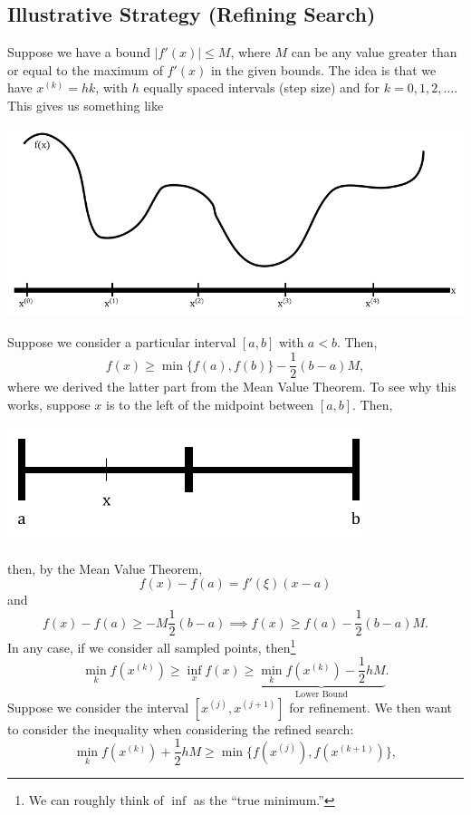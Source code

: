 \documentclass[letterpaper]{article}
\begin{document}
\subsection{Illustrative Strategy (Refining Search)}
Suppose we have a bound $|f'(x)| \leq M$, where $M$ can be any value greater than or equal to the maximum of $f'(x)$ in the given bounds. The idea is that we have $x^{(k)} = hk$, with $h$ equally spaced intervals (step size) and for $k = 0, 1, 2, \hdots$. This gives us something like 
\begin{center}
    \includegraphics[scale=0.5]{../assets/1varopt_ex2.png}
\end{center}
Suppose we consider a particular interval $[a, b]$ with $a < b$. Then, 
\[f(x) \geq \min\{f(a), f(b)\} - \frac{1}{2} (b - a) M,\]
where we derived the latter part from the Mean Value Theorem. To see why this works, suppose $x$ is to the left of the midpoint between $[a, b]$. Then, 
\begin{center}
    \includegraphics[scale=0.5]{../assets/interval_left.png}
\end{center}
then, by the Mean Value Theorem, \[f(x) - f(a) = f'(\xi)(x - a)\]
and \[f(x) - f(a) \geq -M\frac{1}{2}(b - a) \implies f(x) \geq f(a) - \frac{1}{2}(b - a)M.\]
In any case, if we consider all sampled points, then\footnote{We can roughly think of $\inf$ as the ``true minimum.''} 
\[\min_{k} f(x^{(k)}) \geq \inf_{x} f(x) \geq \underbrace{\min_{k} f(x^{(k)}) - \frac{1}{2}hM}_{\text{Lower Bound}}.\]
Suppose we consider the interval $[x^{(j)}, x^{(j + 1)}]$ for refinement. We then want to consider the inequality when considering the refined search:
\[\min_{k} f(x^{(k)}) + \frac{1}{2}hM \geq \min\{f(x^{(j)}), f(x^{(k + 1)})\},\]
\end{document}
